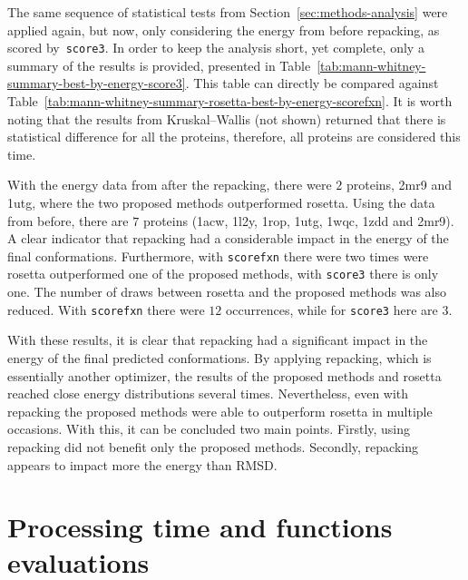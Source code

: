 The same sequence of statistical tests from
Section~\ref{sec:methods-analysis} were applied again, but now, only
considering the energy from before repacking, as scored by~\texttt{score3}.
In order to keep the analysis short, yet complete, only a summary of the
results is provided, presented in
Table~\ref{tab:mann-whitney-summary-best-by-energy-score3}.
This table can directly be compared against
Table~\ref{tab:mann-whitney-summary-rosetta-best-by-energy-scorefxn}.
It is worth noting that the results from Kruskal–Wallis (not shown) returned that there is
statistical difference for all the proteins, therefore, all proteins are
considered this time.

With the energy data from after the repacking, there were $2$ proteins,
2mr9 and 1utg, where the
two proposed methods outperformed rosetta. Using the data from before, there are
$7$ proteins (1acw, 1l2y, 1rop, 1utg, 1wqc, 1zdd and 2mr9).
A clear indicator that repacking had a considerable impact in the
energy of the final conformations. Furthermore, with \texttt{scorefxn} there
were two times were rosetta outperformed one of the proposed methods, with
\texttt{score3} there is only one. The number of draws between rosetta and the
proposed methods was also reduced. With \texttt{scorefxn} there were $12$
occurrences, while for \texttt{score3} here are $3$.

With these results, it is clear that repacking had a significant impact in the
energy of the final predicted conformations. By applying repacking, which is
essentially another optimizer, the results of the proposed methods and rosetta
reached close energy distributions several times. Nevertheless, even with
repacking the proposed methods were able to outperform rosetta in multiple
occasions. With this, it can be concluded two main points. Firstly, using
repacking did not benefit only the proposed methods. Secondly, repacking
appears to impact more the energy than RMSD.

\section{Processing time and functions evaluations} \label{sec:time-and-evals}

